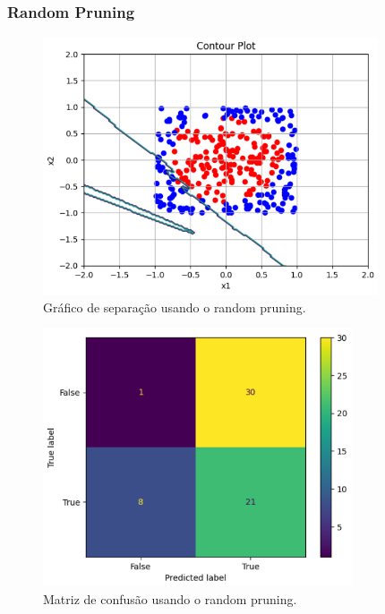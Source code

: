 \documentclass{article}
\begin{document}
\newpage

\subsubsection*{Random Pruning}

\vspace{25pt}

\begin{figure}[h]

    \centering
    \includegraphics[height=3in]{sep_rp_circle.png}
    \caption{Gráfico de separação usando o random pruning.}
    \label{fig:example}
    
\end{figure}

\vspace{25pt}

\begin{figure}[h]

    \centering
    \includegraphics[height=3in]{conf_mat_rp_circle.png}
    \caption{Matriz de confusão usando o random pruning.}
    \label{fig:example}
    
\end{figure}
\end{document}
